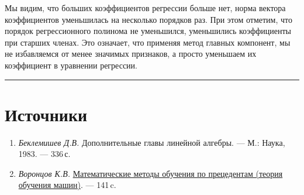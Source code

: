 \documentclass[11pt,a4paper]{article}
\providecommand{\tightlist}{%
      \setlength{\itemsep}{0pt}\setlength{\parskip}{0pt}}
\begin{document}
    \begin{center}
    \end{center}
    
    Мы видим, что больших коэффициентов регрессии больше нет, норма вектора
коэффициентов уменьшилась на несколько порядков раз. При этом отметим,
что порядок регрессионного полинома не уменьшился, уменьшились
коэффициенты при старших членах. Это означает, что применяя метод
главных компонент, мы не избавляемся от менее значимых признаков, а
просто уменьшаем их коэффициент в уравнении регрессии.

    \begin{center}\rule{0.5\linewidth}{0.5pt}\end{center}

    \hypertarget{ux438ux441ux442ux43eux447ux43dux438ux43aux438}{%
\section{Источники}\label{ux438ux441ux442ux43eux447ux43dux438ux43aux438}}

\begin{enumerate}
\def\labelenumi{\arabic{enumi}.}
\tightlist
\item
  \emph{Беклемишев Д.В.} Дополнительные главы линейной алгебры. --- М.:
  Наука, 1983. --- 336\,с.
\item
  \emph{Воронцов К.В.}
  \href{http://www.machinelearning.ru/wiki/images/6/6d/Voron-ML-1.pdf}{Математические
  методы обучения по прецедентам (теория обучения машин)}. --- 141\,c.
\end{enumerate}
\end{document}
